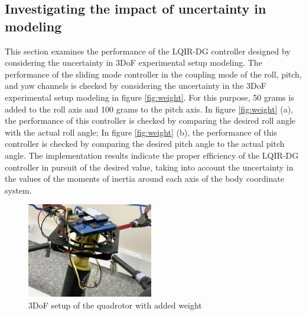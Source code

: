 \documentclass[3p,times]{elsarticle}
\begin{document}
\subsection{Investigating the impact of uncertainty in modeling }
\noindent This section examines the performance of the LQIR-DG controller designed by considering the uncertainty in 3DoF experimental setup modeling. The performance of the sliding mode controller in the coupling mode of the roll, pitch, and yaw channels is checked by considering the uncertainty in the 3DoF experimental setup modeling in figure \ref{fig:weight}. For this purpose, 50 grams is added to the roll axis and 100 grams to the pitch axis. In figure \ref{fig:weight} (a), the performance of this controller is checked by comparing the desired roll angle with the actual roll angle; In figure \ref{fig:weight} (b), the performance of this controller is checked by comparing the desired pitch angle to the actual pitch angle. The implementation results indicate the proper efficiency of the LQIR-DG controller in pursuit of the desired value, taking into account the uncertainty in the values of the moments of inertia around each axis of the body coordinate system.
\begin{figure}[H]
	\centering
	\includegraphics[width=0.49\textwidth]{../Figure/implementation/weight/Quad_with_weight.jpg}
	\caption{3DoF setup of the quadrotor with added weight}
	\label{fig:quadrotor_with_weight}
 \end{figure}
\end{document}
